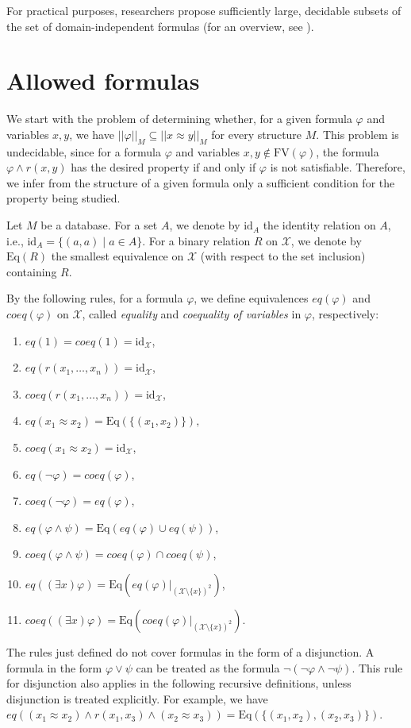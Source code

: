 \documentclass{lmcs}
\def\tu#1{( #1)}
\def\X{\mathcal X}
\def\eq{eq}
\def\coeq{coeq}
\def\id{\textrm{id}}
\def\Eq{{\textrm{Eq}}}
\def\FV{\textrm{FV}}
\newcommand{\st}{%
	\ensuremath{\;|\;}
}
\begin{document}
For practical purposes, researchers propose sufficiently large, decidable subsets of the set of domain-independent formulas (for an overview,  see  \cite{Topor09}).


\section{Allowed formulas}

We start with the problem of determining whether, for a given formula $\varphi$ and variables $x,y$, we have $||\varphi||_M\subseteq||x\approx y||_M$ for every structure $M$. This problem is undecidable, since for a formula $\varphi$ and variables $x,y\notin\FV(\varphi)$, the formula $\varphi\wedge r(x,y)$ has the desired property if and only if $\varphi$ is not satisfiable. Therefore, we infer from the structure of a given formula only a sufficient condition for the property being studied. 

Let $M$ be a database. For a set $A$, we denote by $\id_A$ the identity relation on $A$, i.e., $\id_A=\{\tu{a,a}\st a\in A\}$. For a binary relation $R$ on $\X$, we denote by $\Eq(R)$ the smallest equivalence on $\X$ (with respect to the set inclusion) containing $R$.

By the following rules, for a formula $\varphi$, we define equivalences $\eq(\varphi)$ and $\coeq(\varphi)$ on $\X$, called \emph{equality} and \emph{coequality of variables} in $\varphi$, respectively:
\begin{enumerate}
\item $\eq(1)=\coeq(1)=\id_\X$,
\item $\eq(r(x_1,\ldots,x_n))=\id_\X$,
\item $\coeq(r(x_1,\ldots,x_n))=\id_\X$,
\item $\eq(x_1\approx x_2)=\Eq(\{\tu{x_1,x_2}\}),$ 
\item $\coeq(x_1\approx x_2)=\id_\X$,
\item $\eq(\neg\varphi)=\coeq(\varphi)$,
\item $\coeq(\neg\varphi)=\eq(\varphi)$,
\item $\eq(\varphi\wedge\psi)=\Eq(\eq(\varphi)\cup\eq(\psi))$,
\item $\coeq(\varphi\wedge\psi)=\coeq(\varphi)\cap\coeq(\psi)$,
\item $\eq((\exists x)\varphi)=\Eq(\eq(\varphi)|_{(\X\setminus\{x\})^2})$,
\item $\coeq((\exists x)\varphi)=\Eq(\coeq(\varphi)|_{(\X\setminus\{x\})^2})$.
\end{enumerate}
The rules just defined do not cover formulas in the form of a disjunction. A formula in the form $\varphi\vee\psi$ can be treated as the formula $\neg(\neg\varphi\wedge\neg\psi)$. This rule for disjunction also applies in the following recursive definitions, unless disjunction is treated explicitly. For example, we have $\eq((x_1\approx x_2)\wedge r(x_1,x_3)\wedge(x_2\approx x_3))=\Eq(\{\tu{x_1, x_2},\tu{x_2,x_3}\})$.
\end{document}
